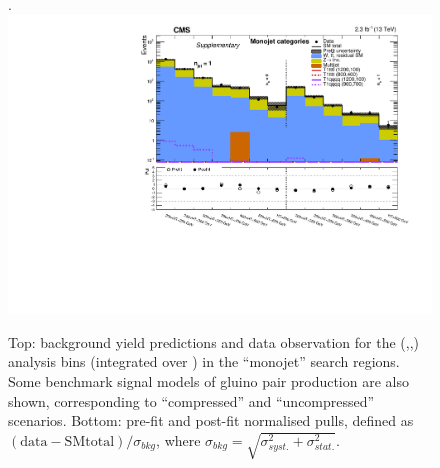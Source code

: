 \clearpage
\begin{landscape}
  \begin{center}
    \begin{figure}[h!]
      \caption{Top: background yield predictions and data observation for the (\njet,\nb,\scalht) analysis bins (integrated over \mht) in the ``monojet'' search regions. Some benchmark signal models of gluino pair production are also shown, corresponding to ``compressed'' and ``uncompressed'' scenarios. Bottom: pre-fit and post-fit normalised pulls, defined as $(\mathrm{data}-\mathrm{SM total})/\sigma_{bkg}$, where $\sigma_{bkg}=\sqrt{\sigma^{2}_{syst.}+\sigma^{2}_{stat.}}$.  \label{fig:summaryPlot_Monojet}}.
      \includegraphics[width=0.75\linewidth]{supplementary/figures/summaryPlot_Monojet_prefit_overlay_fit_b}
    \end{figure}
  \end{center}
\end{landscape}


